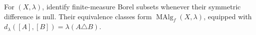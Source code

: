 
For $(X,\lambda)$, identify finite-measure Borel subsets whenever their symmetric difference is null. Their equivalence classes form $\operatorname{MAlg}_f(X,\lambda)$, equipped with $d_\lambda([A],[B])=\lambda(A\triangle B)$.
